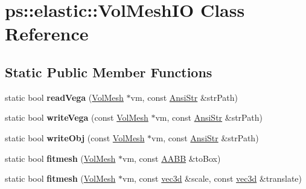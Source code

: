 \hypertarget{classps_1_1elastic_1_1VolMeshIO}{}\section{ps\+:\+:elastic\+:\+:Vol\+Mesh\+I\+O Class Reference}
\label{classps_1_1elastic_1_1VolMeshIO}
\subsection*{Static Public Member Functions}
\begin{DoxyCompactItemize}
\item 
\hypertarget{classps_1_1elastic_1_1VolMeshIO_a2ee3182c8f5da7c1e3213e5ad7c145c1}{}static bool {\bfseries read\+Vega} (\hyperlink{classps_1_1elastic_1_1VolMesh}{Vol\+Mesh} $\ast$vm, const \hyperlink{classps_1_1base_1_1CAString}{Ansi\+Str} \&str\+Path)\label{classps_1_1elastic_1_1VolMeshIO_a2ee3182c8f5da7c1e3213e5ad7c145c1}

\item 
\hypertarget{classps_1_1elastic_1_1VolMeshIO_a3ed22e7e0efbcae3585e9438e36b7625}{}static bool {\bfseries write\+Vega} (const \hyperlink{classps_1_1elastic_1_1VolMesh}{Vol\+Mesh} $\ast$vm, const \hyperlink{classps_1_1base_1_1CAString}{Ansi\+Str} \&str\+Path)\label{classps_1_1elastic_1_1VolMeshIO_a3ed22e7e0efbcae3585e9438e36b7625}

\item 
\hypertarget{classps_1_1elastic_1_1VolMeshIO_a7d5b18fc5acf4482651e8cc3c8602fac}{}static bool {\bfseries write\+Obj} (const \hyperlink{classps_1_1elastic_1_1VolMesh}{Vol\+Mesh} $\ast$vm, const \hyperlink{classps_1_1base_1_1CAString}{Ansi\+Str} \&str\+Path)\label{classps_1_1elastic_1_1VolMeshIO_a7d5b18fc5acf4482651e8cc3c8602fac}

\item 
\hypertarget{classps_1_1elastic_1_1VolMeshIO_a119a5bc6321996881442b2ce14896429}{}static bool {\bfseries fitmesh} (\hyperlink{classps_1_1elastic_1_1VolMesh}{Vol\+Mesh} $\ast$vm, const \hyperlink{classps_1_1base_1_1AABB}{A\+A\+B\+B} \&to\+Box)\label{classps_1_1elastic_1_1VolMeshIO_a119a5bc6321996881442b2ce14896429}

\item 
\hypertarget{classps_1_1elastic_1_1VolMeshIO_a2d82c485e49469095d7f265c40e2cbd6}{}static bool {\bfseries fitmesh} (\hyperlink{classps_1_1elastic_1_1VolMesh}{Vol\+Mesh} $\ast$vm, const \hyperlink{classps_1_1base_1_1Vec3}{vec3d} \&scale, const \hyperlink{classps_1_1base_1_1Vec3}{vec3d} \&translate)\label{classps_1_1elastic_1_1VolMeshIO_a2d82c485e49469095d7f265c40e2cbd6}


\end{DoxyCompactItemize}
